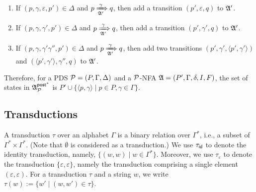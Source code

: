 \smallskip
\fbox
{
\begin{minipage}{0.9\textwidth}
\begin{enumerate}
    \item If $(p, \gamma, \varepsilon, p') \in \Delta$ and $p \xRightarrow[{\mathfrak{A} }']{\gamma} q$, then add a transition $(p', \varepsilon, q)$ to ${\mathfrak{A} }'$. 
%
    \item If $(p, \gamma, \gamma', p') \in \Delta$ and $p \xRightarrow[{\mathfrak{A} }']{\gamma} q$, then add a transition $(p', \gamma', q)$ to ${\mathfrak{A} }'$. 
%
    \item If $(p, \gamma, \gamma' \gamma'', p') \in \Delta$ and $p \xRightarrow[{\mathfrak{A} }']{\gamma } q$, then add two transitions $(p', \gamma', \langle p', \gamma'\rangle)$ and $(\langle p', \gamma' \rangle, \gamma'', q)$ to ${\mathfrak{A} }'$.     
\end{enumerate}
\end{minipage}
}

\smallskip

Therefore, for a PDS ${\mathcal{P} }=(P,\Gamma,\Delta)$ and a ${\mathcal{P} }$-NFA ${\mathfrak{A} } = (P', \Gamma, \delta, I, F)$, the set of states in ${\mathfrak{A} }^{{\mathsf{post} }^*}_{\mathcal{P} }$ is $P' \cup \{\langle p, \gamma \rangle \mid p \in P, \gamma \in \Gamma \}$.


\subsection{Transductions}
A transduction $\tau$ over an alphabet $\Gamma$ is a binary relation over $\Gamma^*$, i.e., a subset of $\Gamma^* \times \Gamma^*$. (Note that $\emptyset$ is considered as a transduction.)
We use $\tau_{\mathsf{id}}$ to denote the identity transduction, namely,  $\{(w,w) \mid w \in \Gamma^*\}$. 
Moreover, we use $\tau_\varepsilon$ to denote the transduction $\{\varepsilon, \varepsilon\}$, namely the transduction comprising a single element $(\varepsilon, \varepsilon)$.
For a transduction $\tau$ and a string $w$, we write $\tau(w):= \{w' \mid (w, w') \in \tau \}$.

